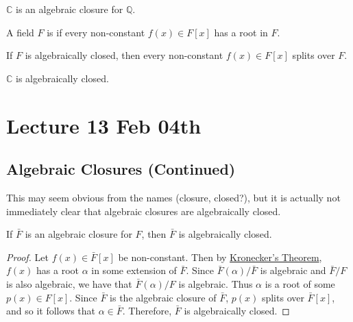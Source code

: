 \documentclass[notoc,notitlepage,nobib]{tufte-book}
\begin{document}
\begin{eg}
  $\mathbb{C}$ is  an algebraic closure for $\mathbb{Q}$.
\end{eg}

\begin{defn}\label{defn:algebraically_closed}
  A field $F$ is  if every non-constant $f(x) \in F[x]$
  has a root in $F$.
\end{defn}

\begin{remark}
  If $F$ is algebraically closed, then every non-constant $f(x) \in F[x]$ splits over $F$.
\end{remark}

\begin{eg}
  $\mathbb{C}$ is algebraically closed.
\end{eg}



\chapter{Lecture 13 Feb 04th}%
\label{chp:lecture_13_feb_04th}

\section{Algebraic Closures (Continued)}%
\label{sec:algebraic_closures_continued}

This may seem obvious from the names (closure, closed?), but it is actually not
immediately clear that algebraic closures are algebraically closed.

\begin{propo}\label{propo:algebraic_closures_are_algebraically_closed}
  If $\bar{F}$ is an algebraic closure for $F$, then $\bar{F}$ is algebraically closed.
\end{propo}

\begin{proof}
  Let $f(x) \in \bar{F}[x]$ be non-constant. Then by
  \hyperref[thm:kronecker_s_theorem]{Kronecker's Theorem}, $f(x)$ has a root $\alpha$ in
  some extension of $\bar{F}$. Since $\bar{F}(\alpha) / \bar{F}$ is algebraic and $\bar{F}
  / F$ is also algebraic, we have that $\bar{F}(\alpha) / F$ is algebraic. Thus $\alpha$
  is a root of some $p(x) \in F[x]$. Since $\bar{F}$ is the algebraic closure of
  $\bar{F}$, $p(x)$ splits over $\bar{F}[x]$, and so it follows that $\alpha \in \bar{F}$.
  Therefore, $\bar{F}$ is algebraically closed.
\end{proof}
\end{document}
